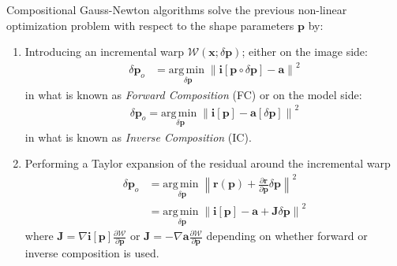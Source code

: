 Compositional Gauss-Newton algorithms solve the previous non-linear optimization problem with respect to the shape parameters $\mathbf{p}$ by:
\begin{enumerate}
    \item Introducing an incremental warp $\mathcal{W}(\mathbf{x}; \delta \mathbf{p})$; either on the image side:
    \label{it:step_1}
    \begin{equation}
        \begin{aligned}
            \delta \mathbf{p}_o & = \underset{\delta \mathbf{p}}{\mathrm{arg\,min\;}} \left\| \mathbf{i} [\mathbf{p} \circ \delta \mathbf{p}] - \mathbf{a} \right\|^2 
        \label{eq:fc}
        \end{aligned}
    \end{equation}
    in what is known as \emph{Forward Composition} (FC) or on the model side: 
    \begin{equation}
        \begin{aligned}
            \delta \mathbf{p}_o = \underset{\delta \mathbf{p}}{\mathrm{arg\,min\;}}  \left\| \mathbf{i} [\mathbf{p}] - \mathbf{a}[\delta \mathbf{p}] \right\|^2 
        \label{eq:ic}
        \end{aligned}
    \end{equation}
    in what is known as \emph{Inverse Composition} (IC).
    
    \item Performing a Taylor expansion of the residual around the incremental warp
    \begin{equation}
        \begin{aligned}
            \delta \mathbf{p}_o & = \underset{\delta\mathbf{p}}{\mathrm{arg\,min\;}} \left\| \mathbf{r}(\mathbf{p}) + \frac{\partial\mathbf{r}}{\partial\mathbf{p}} \delta\mathbf{p} \right\|^2
            \\
            & = \underset{\delta\mathbf{p}}{\mathrm{arg\,min\;}} \left\| \mathbf{i} [\mathbf{p}] - \mathbf{a} + \mathbf{J} \delta \mathbf{p} \right\|^2
        \label{eq:taylor}
        \end{aligned}
    \end{equation}
    where $\mathbf{J} = \nabla \mathbf{i}[\mathbf{p}] \frac{\partial\mathcal{W}}{\partial\mathbf{p}}$ or $\mathbf{J} = -\nabla \mathbf{a} \frac{\partial\mathcal{W}}{\partial\mathbf{p}}$ depending on whether forward or inverse composition is used.
    

\end{enumerate}
